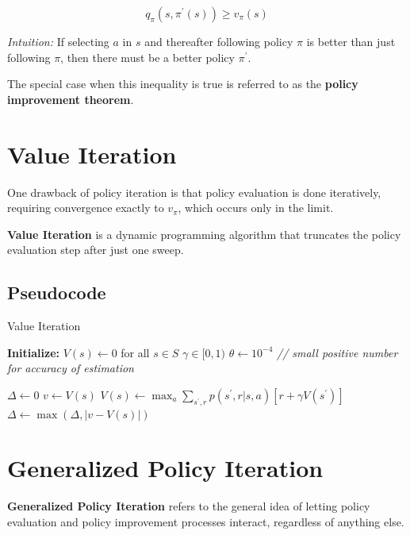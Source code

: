 \documentclass[
  letterpaper,
  DIV=11,
  numbers=noendperiod]{scrreprt}
\begin{document}
\[ 
q_{\pi}(s, \pi^{'}(s)) \geq v_{\pi}(s) 
\]

\emph{Intuition:} If selecting \(a\) in \(s\) and thereafter following
policy \(\pi\) is better than just following \(\pi\), then there must be
a better policy \(\pi^{'}\).

The special case when this inequality is true is referred to as the
\textbf{policy improvement theorem}.

\section{Value Iteration}\label{value-iteration}

One drawback of policy iteration is that policy evaluation is done
iteratively, requiring convergence exactly to \(v_{\pi}\), which occurs
only in the limit.

\textbf{Value Iteration} is a dynamic programming algorithm that
truncates the policy evaluation step after just one sweep.

\subsection{Pseudocode}\label{pseudocode-4}

\begin{algorithm}[htb!]
\caption{Value Iteration}
\begin{algorithmic}[1]
\State \textbf{Initialize:} 
\State $V(s) \gets 0$ for all $s \in S$
\State $\gamma \in [0,1)$
\State $\theta \gets 10^{-4}$  \textit{// small positive number for accuracy of estimation}

\Repeat
    \State $\Delta \gets 0$
        \State $v \gets V(s)$
        \State $V(s) \gets \max_a \sum_{s^{'},r} p(s^{'},r|s,a) \left[ r + \gamma V(s^{'}) \right]$
        \State $\Delta \gets \max(\Delta, |v - V(s)|)$
    \Endfor
\Until{$\Delta < \theta$}

\end{algorithmic}
\end{algorithm}

\section{Generalized Policy
Iteration}\label{generalized-policy-iteration}

\textbf{Generalized Policy Iteration} refers to the general idea of
letting policy evaluation and policy improvement processes interact,
regardless of anything else.
\end{document}
